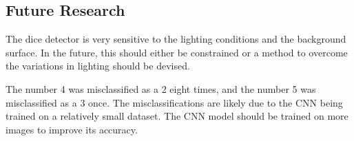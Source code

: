 \documentclass[conference]{IEEEtran}
\begin{document}
\subsection{Future Research}

The dice detector is very sensitive to the lighting conditions and the background surface.
In the future, this should either be constrained or a method to overcome the variations in lighting should be devised.

The number 4 was misclassified as a 2 eight times, and the number 5 was misclassified as a 3 once.
The misclassifications are likely due to the CNN being trained on a relatively small dataset. 
The CNN model should be trained on more images to improve its accuracy.

\printbibliography
\end{document}
